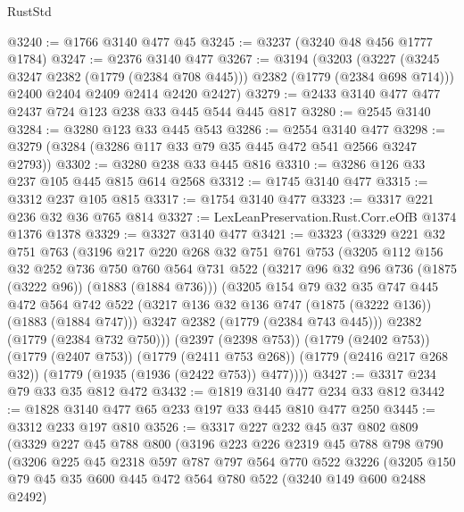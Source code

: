 \begin{lexlean}{RustStd}
\begin{coremodule}
{\begin{coremodule}
{{{{{{{{{{{@3240 := @1766 @3140 @477 @45
@3245 := @3237 (@3240 @48 @456 @1777 @1784)
@3247 := @2376 @3140 @477
@3267 := @3194
    (@3203
      (@3227 (@3245 @3247 @2382 (@1779 (@2384 @708 @445))) @2382 (@1779 (@2384 @698 @714)))
      @2400
      @2404
      @2409
      @2414
      @2420
      @2427)
@3279 := @2433 @3140 @477 @477 @2437 @724 @123 @238 @33 @445 @544 @445 @817
@3280 := @2545 @3140
@3284 := @3280 @123 @33 @445 @543
@3286 := @2554 @3140 @477
@3298 := @3279 (@3284 (@3286 @117 @33 @79 @35 @445 @472 @541 @2566 @3247 @2793))
@3302 := @3280 @238 @33 @445 @816
@3310 := @3286 @126 @33 @237 @105 @445 @815 @614 @2568
@3312 := @1745 @3140 @477
@3315 := @3312 @237 @105 @815
@3317 := @1754 @3140 @477
@3323 := @3317 @221 @236 @32 @36 @765 @814
@3327 := LexLeanPreservation.Rust.Corr.eOfB @1374 @1376 @1378
@3329 := @3327 @3140 @477
@3421 := @3323
    (@3329
      @221
      @32
      @751
      @763
      (@3196
        @217
        @220
        @268
        @32
        @751
        @761
        @753
        (@3205
          @112
          @156
          @32
          @252
          @736
          @750
          @760
          @564
          @731
          @522
          (@3217 @96 @32 @96 @736 (@1875 (@3222 @96)) (@1883 (@1884 @736)))
          (@3205
            @154
            @79
            @32
            @35
            @747
            @445
            @472
            @564
            @742
            @522
            (@3217 @136 @32 @136 @747 (@1875 (@3222 @136)) (@1883 (@1884 @747)))
            @3247
            @2382
            (@1779 (@2384 @743 @445)))
          @2382
          (@1779 (@2384 @732 @750)))
        (@2397 (@2398 @753))
        (@1779 (@2402 @753))
        (@1779 (@2407 @753))
        (@1779 (@2411 @753 @268))
        (@1779 (@2416 @217 @268 @32))
        (@1779 (@1935 (@1936 (@2422 @753)) @477))))
@3427 := @3317 @234 @79 @33 @35 @812 @472
@3432 := @1819 @3140 @477 @234 @33 @812
@3442 := @1828 @3140 @477 @65 @233 @197 @33 @445 @810 @477 @250
@3445 := @3312 @233 @197 @810
@3526 := @3317
    @227
    @232
    @45
    @37
    @802
    @809
    (@3329
      @227
      @45
      @788
      @800
      (@3196
        @223
        @226
        @2319
        @45
        @788
        @798
        @790
        (@3206
          @225
          @45
          @2318
          @597
          @787
          @797
          @564
          @770
          @522
          @3226
          (@3205
            @150
            @79
            @45
            @35
            @600
            @445
            @472
            @564
            @780
            @522
            (@3240 @149 @600 @2488 @2492)
}}}}}}}}}}}
\end{coremodule}}
\end{coremodule}
\end{lexlean}
